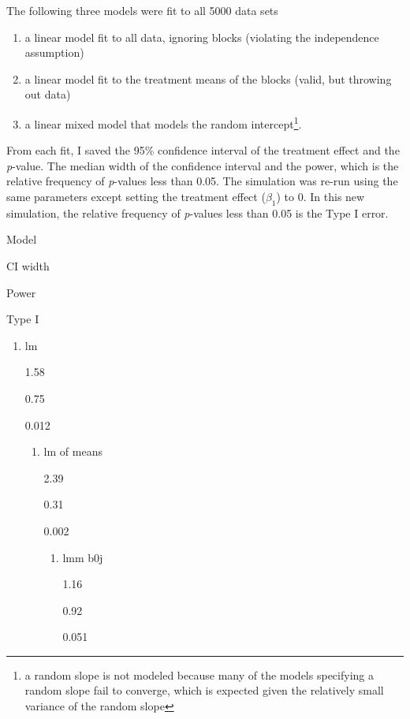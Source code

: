 \documentclass[]{book}
\providecommand{\tightlist}{%
  \setlength{\itemsep}{0pt}\setlength{\parskip}{0pt}}
\let\rmarkdownfootnote\footnote%
\def\footnote{\protect\rmarkdownfootnote}
\begin{document}
The following three models were fit to all 5000 data sets

\begin{enumerate}
\def\labelenumi{\arabic{enumi}.}
\tightlist
\item
  a linear model fit to all data, ignoring blocks (violating the independence assumption)
\item
  a linear model fit to the treatment means of the blocks (valid, but throwing out data)
\item
  a linear mixed model that models the random intercept\footnote{a random slope is not modeled because many of the models specifying a random slope fail to converge, which is expected given the relatively small variance of the random slope}.
\end{enumerate}

From each fit, I saved the 95\% confidence interval of the treatment effect and the \emph{p}-value. The median width of the confidence interval and the power, which is the relative frequency of \emph{p}-values less than 0.05. The simulation was re-run using the same parameters except setting the treatment effect (\(\beta_1\)) to 0. In this new simulation, the relative frequency of \emph{p}-values less than 0.05 is the Type I error.

Model

CI width

Power

Type I

\begin{enumerate}
\def\labelenumi{\arabic{enumi}.}
\tightlist
\item
  lm

  1.58

  0.75

  0.012

  \begin{enumerate}
  \def\labelenumii{\arabic{enumii}.}
  \setcounter{enumii}{1}
  \tightlist
  \item
    lm of means

    2.39

    0.31

    0.002

    \begin{enumerate}
    \def\labelenumiii{\arabic{enumiii}.}
    \setcounter{enumiii}{2}
    \tightlist
    \item
      lmm b0j

      1.16

      0.92

      0.051
    \end{enumerate}
  \end{enumerate}
\end{enumerate}
\end{document}
